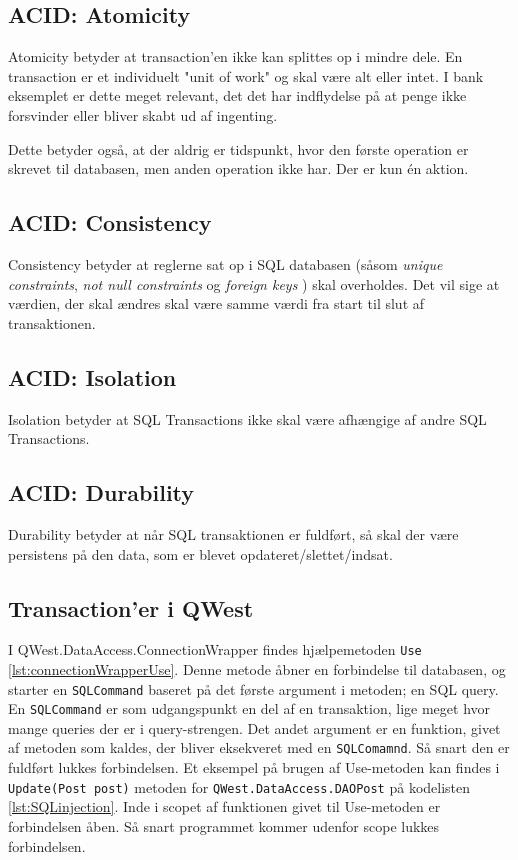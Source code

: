 \subsection{ACID: Atomicity}\label{sec:acidAtomic}
Atomicity betyder at transaction'en ikke kan splittes op i mindre dele. En transaction er et individuelt "unit of work" og skal være alt eller intet. \cite{DistributedSystems} I bank eksemplet er dette meget relevant, det det har indflydelse på at penge ikke forsvinder eller bliver skabt ud af ingenting. 

Dette betyder også, at der aldrig er tidspunkt, hvor den første operation er skrevet til databasen, men anden operation ikke har. Der er kun én aktion.

\subsection{ACID: Consistency}\label{sec:acidConsistent}
Consistency betyder at reglerne sat op i SQL databasen (såsom \textit{unique constraints}, \textit{not null constraints} og \textit{foreign keys} \cite{SqlConstraints}) skal overholdes. Det vil sige at værdien, der skal ændres skal være samme værdi fra start til slut af transaktionen.

\subsection{ACID: Isolation}\label{sec:acidIsolated}
Isolation betyder at SQL Transactions ikke skal være afhængige af andre SQL Transactions.

\subsection{ACID: Durability}\label{sec:acidDurable}
Durability betyder at når SQL transaktionen er fuldført, så skal der være persistens på den data, som er blevet opdateret/slettet/indsat.

\subsection{Transaction'er i QWest}\label{sec:transactionQwest}
I QWest.DataAccess.ConnectionWrapper findes hjælpemetoden \texttt{Use} \ref{lst:connectionWrapperUse}. Denne metode åbner en forbindelse til databasen, og starter en \texttt{SQLCommand} baseret på det første argument i metoden; en SQL query. En \texttt{SQLCommand} er som udgangspunkt en del af en transaktion, lige meget hvor mange queries der er i query-strengen. Det andet argument er en funktion, givet af metoden som kaldes, der bliver eksekveret med en \texttt{SQLComamnd}. Så snart den er fuldført lukkes forbindelsen. Et eksempel på brugen af Use-metoden kan findes i \texttt{Update(Post post)} metoden for \texttt{QWest.DataAccess.DAOPost} på kodelisten \ref{lst:SQLinjection}. Inde i scopet af funktionen givet til Use-metoden er forbindelsen åben. Så snart programmet kommer udenfor scope lukkes forbindelsen.

